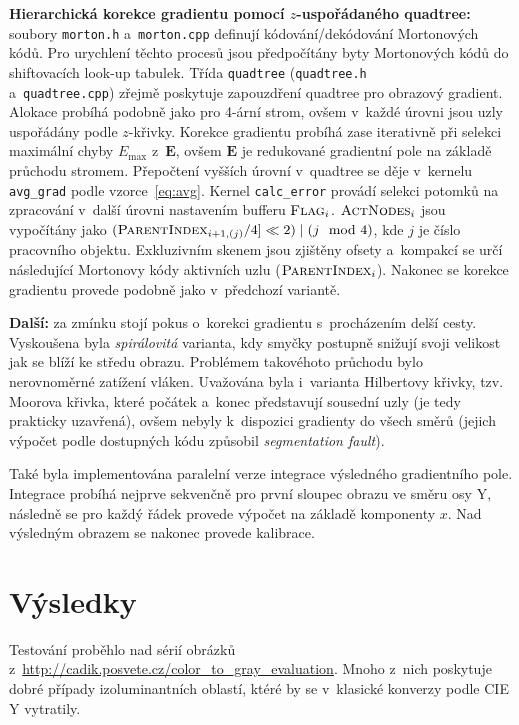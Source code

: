 \documentclass[11pt,a4paper,oneside]{article}
\begin{document}
	\textbf{Hierarchická korekce gradientu pomocí $z$-uspořádaného quadtree:} \;
	soubory \texttt{morton.h} a~\texttt{morton.cpp} definují kódování/dekódování Mortonových kódů.
	Pro urychlení těchto procesů jsou předpočítány byty Mortonových kódů do shiftovacích look-up
	tabulek. Třída \texttt{quadtree} (\texttt{quadtree.h} \\ a~\texttt{quadtree.cpp})
	zřejmě poskytuje zapouzdření quadtree pro obrazový gradient. Alokace probíhá podobně jako pro 4-ární
	strom, ovšem v~každé úrovni jsou uzly uspořádány podle $z$-křivky. Korekce gradientu
	probíhá zase iterativně při selekci maximální chyby $E_{\max}$ z~$\textbf{E}$, ovšem
	$\textbf{E}$ je redukované gradientní pole na základě průchodu stromem. Přepočtení vyšších
	úrovní v~quadtree se děje v~kernelu \texttt{avg\_grad} podle vzorce~\eqref{eq:avg}.
	Kernel \texttt{calc\_error} provádí selekci potomků na zpracování v~další úrovni
	nastavením bufferu $\textsc{Flag}_i$. $\textsc{ActNodes}_i$ jsou vypočítány jako
	$ (\textsc{ParentIndex}_{i + 1, (j)} / 4] \ll 2) \mid (j \mod 4)$, kde $j$ je číslo
	pracovního objektu. Exkluzivním skenem jsou zjištěny ofsety a~kompakcí se určí následující
	Mortonovy kódy aktivních uzlu ($\textsc{ParentIndex}_i$). Nakonec se korekce gradientu provede
	podobně jako v~předchozí variantě.

	\textbf{Další:} \; za zmínku stojí pokus o~korekci gradientu s~procházením delší cesty.
	Vyskoušena byla \emph{spirálovitá} varianta, kdy smyčky postupně snižují svoji velikost
	jak se blíží ke středu obrazu. Problémem takovéhoto průchodu bylo nerovnoměrné zatížení vláken.
	Uvažována byla i~varianta Hilbertovy křivky, tzv. Moorova křivka, které počátek a~konec
	představují sousední uzly (je tedy prakticky uzavřená), ovšem nebyly k~dispozici gradienty
	do všech směrů (jejich výpočet podle dostupných kódu způsobil \emph{segmentation fault}).

	Také byla implementována paralelní verze integrace výsledného gradientního pole. Integrace
	probíhá nejprve sekvenčně pro první sloupec obrazu ve směru osy Y, následně se pro
	každý řádek provede výpočet na základě komponenty $x$. Nad výsledným obrazem
	se nakonec provede kalibrace.

	\section{Výsledky}
	Testování proběhlo nad sérií obrázků z~\url{http://cadik.posvete.cz/color_to_gray_evaluation}.
	Mnoho z~nich poskytuje dobré případy izoluminantních oblastí, ktéré by se v~klasické konverzy
	podle CIE Y vytratily.
\end{document}
